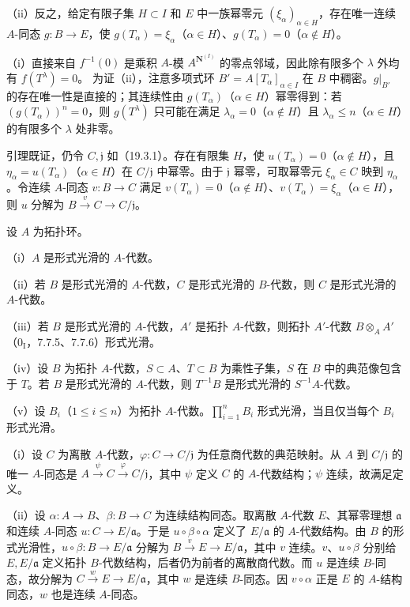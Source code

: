 （ii）反之，给定有限子集 $H\subset I$ 和 $E$ 中一族幂零元 $(\xi_\alpha)_{\alpha\in H}$，存在唯一连续 $A$-同态 $g:B\to E$，使 $g(T_\alpha)=\xi_\alpha$（$\alpha\in H$）、$g(T_\alpha)=0$（$\alpha\notin H$）。

（i）直接来自 $f^{-1}(0)$ 是乘积 $A$-模 $A^{\mathbf N^{(I)}}$ 的零点邻域，因此除有限多个 $\lambda$ 外均有 $f(T^\lambda)=0$。
为证（ii），注意多项式环 $B'=A[T_\alpha]_{\alpha\in I}$ 在 $B$ 中稠密。$g|_{B'}$ 的存在唯一性是直接的；其连续性由 $g(T_\alpha)$（$\alpha\in H$）幂零得到：若 $(g(T_\alpha))^n=0$，则 $g(T^\lambda)$ 只可能在满足 $\lambda_\alpha=0$（$\alpha\notin H$）且 $\lambda_\alpha\leq n$（$\alpha\in H$）的有限多个 $\lambda$ 处非零。

引理既证，仍令 $C,\mathfrak j$ 如（19.3.1）。存在有限集 $H$，使 $u(T_\alpha)=0$（$\alpha\notin H$），且 $\eta_\alpha=u(T_\alpha)$（$\alpha\in H$）在 $C/\mathfrak j$ 中幂零。由于 $\mathfrak j$ 幂零，可取幂零元 $\xi_\alpha\in C$ 映到 $\eta_\alpha$。令连续 $A$-同态 $v:B\to C$ 满足 $v(T_\alpha)=0$（$\alpha\notin H$）、$v(T_\alpha)=\xi_\alpha$（$\alpha\in H$），则 $u$ 分解为 $B\xrightarrow{v}C\to C/\mathfrak j$。

设 $A$ 为拓扑环。

（i）$A$ 是形式光滑的 $A$-代数。

（ii）若 $B$ 是形式光滑的 $A$-代数，$C$ 是形式光滑的 $B$-代数，则 $C$ 是形式光滑的 $A$-代数。

（iii）若 $B$ 是形式光滑的 $A$-代数，$A'$ 是拓扑 $A$-代数，则拓扑 $A'$-代数 $B\otimes_AA'$（$0_{\mathrm I}$，7.7.5、7.7.6）形式光滑。

（iv）设 $B$ 为拓扑 $A$-代数，$S\subset A$、$T\subset B$ 为乘性子集，$S$ 在 $B$ 中的典范像包含于 $T$。若 $B$ 是形式光滑的 $A$-代数，则 $T^{-1}B$ 是形式光滑的 $S^{-1}A$-代数。

（v）设 $B_i$（$1\leq i\leq n$）为拓扑 $A$-代数。$\prod_{i=1}^nB_i$ 形式光滑，当且仅当每个 $B_i$ 形式光滑。

（i）设 $C$ 为离散 $A$-代数，$\varphi:C\to C/\mathfrak j$ 为任意商代数的典范映射。从 $A$ 到 $C/\mathfrak j$ 的唯一 $A$-同态是 $A\xrightarrow{\psi}C\xrightarrow{\varphi}C/\mathfrak j$，其中 $\psi$ 定义 $C$ 的 $A$-代数结构；$\psi$ 连续，故满足定义。

（ii）设 $\alpha:A\to B$、$\beta:B\to C$ 为连续结构同态。取离散 $A$-代数 $E$、其幂零理想 $\mathfrak a$ 和连续 $A$-同态 $u:C\to E/\mathfrak a$。于是 $u\circ\beta\circ\alpha$ 定义了 $E/\mathfrak a$ 的 $A$-代数结构。由 $B$ 的形式光滑性，$u\circ\beta:B\to E/\mathfrak a$ 分解为 $B\xrightarrow{v}E\to E/\mathfrak a$，其中 $v$ 连续。$v$、$u\circ\beta$ 分别给 $E,E/\mathfrak a$ 定义拓扑 $B$-代数结构，后者仍为前者的离散商代数。而 $u$ 是连续 $B$-同态，故分解为 $C\xrightarrow{w}E\to E/\mathfrak a$，其中 $w$ 是连续 $B$-同态。因 $v\circ\alpha$ 正是 $E$ 的 $A$-结构同态，$w$ 也是连续 $A$-同态。

